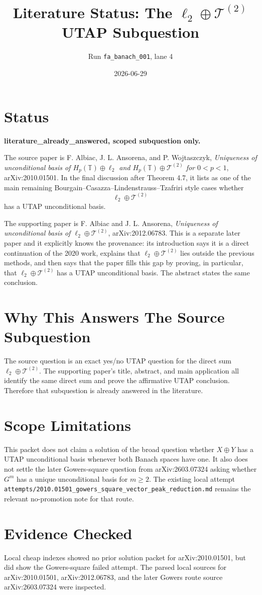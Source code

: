 \documentclass[11pt]{article}
\title{Literature Status: The $\ell_2\oplus\mathcal T^{(2)}$ UTAP Subquestion}
\author{Run \texttt{fa\_banach\_001}, lane 4}
\date{2026-06-29}
\begin{document}
\maketitle

\section*{Status}

\textbf{literature\_already\_answered, scoped subquestion only.}

The source paper is F. Albiac, J. L. Ansorena, and P. Wojtaszczyk,
\emph{Uniqueness of unconditional basis of $H_p(\mathbb T)\oplus\ell_2$ and
$H_p(\mathbb T)\oplus\mathcal T^{(2)}$ for $0<p<1$}, arXiv:2010.01501.
In the final discussion after Theorem 4.7, it lists as one of the main
remaining Bourgain--Casazza--Lindenstrauss--Tzafriri style cases whether
\[
  \ell_2\oplus \mathcal T^{(2)}
\]
has a UTAP unconditional basis.

The supporting paper is F. Albiac and J. L. Ansorena,
\emph{Uniqueness of unconditional basis of $\ell_2\oplus\mathcal T^{(2)}$},
arXiv:2012.06783.  This is a separate later paper and it explicitly knows the
provenance: its introduction says it is a direct continuation of the 2020
work, explains that $\ell_2\oplus\mathcal T^{(2)}$ lies outside the previous
methods, and then says that the paper fills this gap by proving, in particular,
that $\ell_2\oplus\mathcal T^{(2)}$ has a UTAP unconditional basis.  The
abstract states the same conclusion.

\section*{Why This Answers The Source Subquestion}

The source question is an exact yes/no UTAP question for the direct sum
$\ell_2\oplus\mathcal T^{(2)}$.  The supporting paper's title, abstract, and
main application all identify the same direct sum and prove the affirmative
UTAP conclusion.  Therefore that subquestion is already answered in the
literature.

\section*{Scope Limitations}

This packet does not claim a solution of the broad question whether
$X\oplus Y$ has a UTAP unconditional basis whenever both Banach spaces have
one.  It also does not settle the later Gowers-square question from
arXiv:2603.07324 asking whether $G^m$ has a unique unconditional basis for
$m\geq2$.  The existing local attempt
\texttt{attempts/2010.01501\_gowers\_square\_vector\_peak\_reduction.md}
remains the relevant no-promotion note for that route.

\section*{Evidence Checked}

Local cheap indexes showed no prior solution packet for arXiv:2010.01501, but
did show the Gowers-square failed attempt.  The parsed local sources for
arXiv:2010.01501, arXiv:2012.06783, and the later Gowers route source
arXiv:2603.07324 were inspected.
\end{document}
